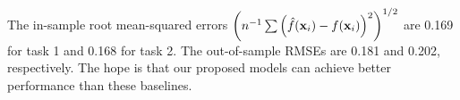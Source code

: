 \documentclass[12pt]{article}
\begin{document}
The in-sample root mean-squared errors $\left(n^{-1}\sum{\left(\hat{f}(\mathbf{x}_{i}) - f(\mathbf{x}_{i})\right)^{2}}\right)^{1/2}$ are 0.169 for task 1 and 0.168 for task 2.
The out-of-sample RMSEs are 0.181 and 0.202, respectively.
The hope is that our proposed models can achieve better performance than these baselines.






\newpage
\end{document}
